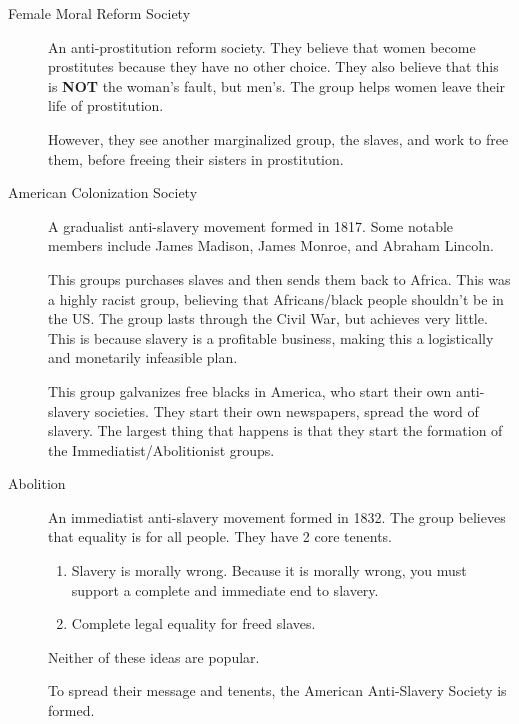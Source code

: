\begin{description}
\item[Female Moral Reform Society] An anti-prostitution reform society.
  They believe that women become prostitutes because they have no other choice.
  They also believe that this is \textbf{NOT} the woman's fault, but men's.
  The group helps women leave their life of prostitution.

  However, they see another marginalized group, the slaves, and work to free them, before freeing their sisters in prostitution.

\item[American Colonization Society] A gradualist anti-slavery movement formed in 1817.
  Some notable members include James Madison, James Monroe, and Abraham Lincoln.

  This groups purchases slaves and then sends them back to Africa.
  This was a highly racist group, believing that Africans/black people shouldn't be in the US.\@
  The group lasts through the Civil War, but achieves very little.
  This is because slavery is a profitable business, making this a logistically and monetarily infeasible plan.

  This group galvanizes free blacks in America, who start their own anti-slavery societies.
  They start their own newspapers, spread the word of slavery.
  The largest thing that happens is that they start the formation of the Immediatist/Abolitionist groups.

\item[Abolition] An immediatist anti-slavery movement formed in 1832.
  The group believes that equality is for all people.
  They have 2 core tenents.
  \begin{enumerate}[noitemsep]
  \item Slavery is morally wrong.
    Because it is morally wrong, you must support a complete and immediate end to slavery.
  \item Complete legal equality for freed slaves.
  \end{enumerate}

  Neither of these ideas are popular.

  To spread their message and tenents, the American Anti-Slavery Society is formed.
\end{description}
